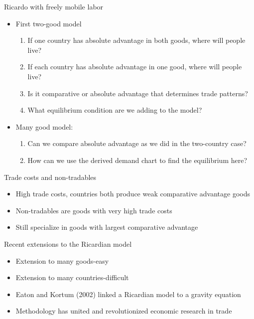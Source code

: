 \documentclass[ignorenonframetext,]{beamer}
\begin{document}
\begin{frame}{Ricardo with freely mobile labor}

    \begin{itemize}
        \item First two-good model
        \begin{enumerate}
            \item If one country has absolute advantage in both goods, where will people live?
            \item If each country has absolute advantage in one good, where will people live?
            \item Is it comparative or absolute advantage that determines trade patterns?
            \item What equilibrium condition are we adding to the model? 
        \end{enumerate}
        \item Many good model: 
        \begin{enumerate}
            \item Can we compare absolute advantage as we did in the two-country case?
            \item How can we use the derived demand chart to find the equilibrium here?
        \end{enumerate}
    \end{itemize}

\end{frame}

\begin{frame}{Trade costs and non-tradables}

    \begin{itemize}
        \item High trade costs, countries both produce weak comparative advantage goods
        \item Non-tradables are goods with very high trade costs 
        \item Still specialize in goods with largest comparative advantage
    \end{itemize}

\end{frame}

\begin{frame}{Recent extensions to the Ricardian model}

    \begin{itemize}
        \item Extension to many goods-easy
        \item Extension to many countries-difficult
        \item Eaton and Kortum (2002) linked a Ricardian model to a gravity equation 
        \item Methodology has united and revolutionized economic research in trade
    \end{itemize}

\end{frame}
\end{document}
